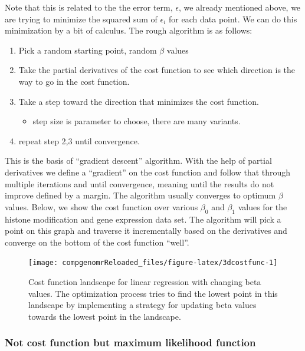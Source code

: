 \documentclass[12pt,]{krantz}
\providecommand{\tightlist}{%
  \setlength{\itemsep}{0pt}\setlength{\parskip}{0pt}}
\begin{document}
Note that this is related to the the error term, \(\epsilon\), we already mentioned
above, we are trying to minimize the squared sum of \(\epsilon_i\) for each data
point. We can do this minimization by a bit of calculus.
The rough algorithm is as follows:

\begin{enumerate}
\def\labelenumi{\arabic{enumi}.}
\tightlist
\item
  Pick a random starting point, random \(\beta\) values
\item
  Take the partial derivatives of the cost function to see which direction is
  the way to go in the cost function.
\item
  Take a step toward the direction that minimizes the cost function.

  \begin{itemize}
  \tightlist
  \item
    step size is parameter to choose, there are many variants.
  \end{itemize}
\item
  repeat step 2,3 until convergence.
\end{enumerate}

This is the basis of ``gradient descent'' algorithm. With the help of partial
derivatives we define a ``gradient'' on the cost function and follow that through
multiple iterations and until convergence, meaning until the results do not
improve defined by a margin. The algorithm usually converges to optimum \(\beta\)
values. Below, we show the cost function over various \(\beta_0\) and \(\beta_1\)
values for the histone modification and gene expression data set. The algorithm
will pick a point on this graph and traverse it incrementally based on the
derivatives and converge on the bottom of the cost function ``well''.

\begin{figure}

{\centering \texttt{[image: compgenomrReloaded\_files/figure-latex/3dcostfunc-1]} 

}

\caption{Cost function landscape for linear regression with changing beta values. The optimization process tries to find the lowest point in this landscape by implementing a strategy for updating beta values towards the lowest point in the landscape.}\label{fig:3dcostfunc}
\end{figure}

\hypertarget{not-cost-function-but-maximum-likelihood-function}{%
\subsubsection{Not cost function but maximum likelihood function}\label{not-cost-function-but-maximum-likelihood-function}}
\end{document}
